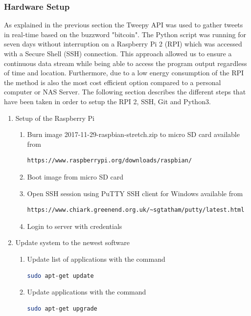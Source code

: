 \documentclass[a4paper,12pt]{article}
\begin{document}
\begin{spacing}{1.2}
\subsubsection{Hardware Setup}
As explained in the previous section the Tweepy API was used to gather tweets in real-time based on the buzzword "bitcoin". The Python script was running for seven days without interruption on a Raspberry Pi 2 (RPI) which was accessed with a Secure Shell (SSH) connection. This approach allowed us to ensure a continuous data stream while being able to access the program output regardless of time and location. Furthermore, due to a low energy consumption of the RPI the method is also the most cost efficient option compared to a personal computer or NAS Server. The following section describes the different steps that have been taken in order to setup the RPI 2, SSH, Git and Python3.\\

\begin{enumerate}

\item Setup of the Raspberry Pi
\begin{enumerate}
\item Burn image 2017-11-29-raspbian-stretch.zip to micro SD card available from
\begin{lstlisting}[language=bash]
https://www.raspberrypi.org/downloads/raspbian/
\end{lstlisting}
\item Boot image from micro SD card 
\item Open SSH session using PuTTY SSH client for Windows available from
\begin{lstlisting}[language=bash] 
https://www.chiark.greenend.org.uk/~sgtatham/putty/latest.html
\end{lstlisting}
\item Login to server with credentials 
\end{enumerate}

\item Update system to the newest software
\begin{enumerate}
\item Update list of applications with the command
\begin{lstlisting}[language=bash]
sudo apt-get update
\end{lstlisting}
\item Update applications with the command
\begin{lstlisting}[language=bash]
sudo apt-get upgrade
\end{lstlisting}
\end{enumerate}


\end{enumerate}
\end{spacing}
\end{document}
